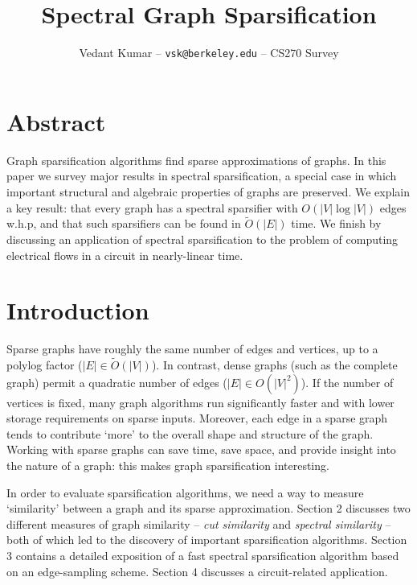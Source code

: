 \documentclass{article}
\title{Spectral Graph Sparsification}
\author{\small{Vedant Kumar -- \texttt{vsk@berkeley.edu} -- CS270 Survey}}
\begin{document}
\maketitle

\newcommand \R{\mathbb{R}}
\newcommand \one{\mathbf{1}}
\newcommand \zero{\mathbf{0}}
\newcommand \Tr{\text{Tr}}
\newcommand \im{\text{im}}
\newcommand \Span{\text{span}}
\newcommand \cut[1]{\text{cut}_{#1}}
\newcommand \textlcsc[1]{\textsc{\MakeLowercase{#1}}}

\section*{Abstract}

Graph sparsification algorithms find sparse approximations of graphs. In
this paper we survey major results in spectral sparsification, a special
case in which important structural and algebraic properties of graphs are
preserved. We explain a key result: that every graph has a spectral
sparsifier with $O(|V|\log|V|)$ edges w.h.p, and that such sparsifiers can
be found in $\tilde{O}(|E|)$ time. We finish by discussing an application of
spectral sparsification to the problem of computing electrical flows in a
circuit in nearly-linear time.

\section{Introduction}

Sparse graphs have roughly the same number of edges and vertices, up to a
polylog factor ($|E| \in \tilde{O}(|V|)$). In contrast, dense graphs (such
as the complete graph) permit a quadratic number of edges ($|E| \in
O(|V|^2)$). If the number of vertices is fixed, many graph algorithms run
significantly faster and with lower storage requirements on sparse inputs.
Moreover, each edge in a sparse graph tends to contribute `more' to the
overall shape and structure of the graph.  Working with sparse graphs can
save time, save space, and provide insight into the nature of a graph: this
makes graph sparsification interesting.

In order to evaluate sparsification algorithms, we need a way to measure
`similarity' between a graph and its sparse approximation. Section 2
discusses two different measures of graph similarity -- \textit{cut
similarity} and \textit{spectral similarity} -- both of which led to the
discovery of important sparsification algorithms. Section 3 contains a
detailed exposition of a fast spectral sparsification algorithm based on an
edge-sampling scheme. Section 4 discusses a circuit-related application.
\end{document}
